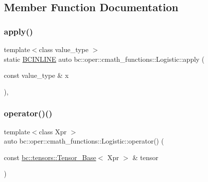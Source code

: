 \subsection{Member Function Documentation}
\mbox{\label{structbc_1_1oper_1_1cmath__functions_1_1Logistic_ac01c5b86f77828ae7e3d46dd701684a6}} 
\subsubsection{\texorpdfstring{apply()}{apply()}}
{\footnotesize\ttfamily template$<$class value\+\_\+type $>$ \\
static \hyperlink{common_8h_a6699e8b0449da5c0fafb878e59c1d4b1}{B\+C\+I\+N\+L\+I\+NE} auto bc\+::oper\+::cmath\+\_\+functions\+::\+Logistic\+::apply (\begin{DoxyParamCaption}\item[{const value\+\_\+type \&}]{x }\end{DoxyParamCaption})\hspace{0.3cm}{\ttfamily [inline]}, {\ttfamily [static]}}

\mbox{\label{structbc_1_1oper_1_1cmath__functions_1_1Logistic_a722ef8ee07bd0966552de7101faddf66}} 
\subsubsection{\texorpdfstring{operator()()}{operator()()}\hspace{0.1cm}{\footnotesize\ttfamily [1/3]}}
{\footnotesize\ttfamily template$<$class Xpr $>$ \\
auto bc\+::oper\+::cmath\+\_\+functions\+::\+Logistic\+::operator() (\begin{DoxyParamCaption}\item[{const \hyperlink{classbc_1_1tensors_1_1Tensor__Base}{bc\+::tensors\+::\+Tensor\+\_\+\+Base}$<$ Xpr $>$ \&}]{tensor }\end{DoxyParamCaption})\hspace{0.3cm}{\ttfamily [inline]}}

